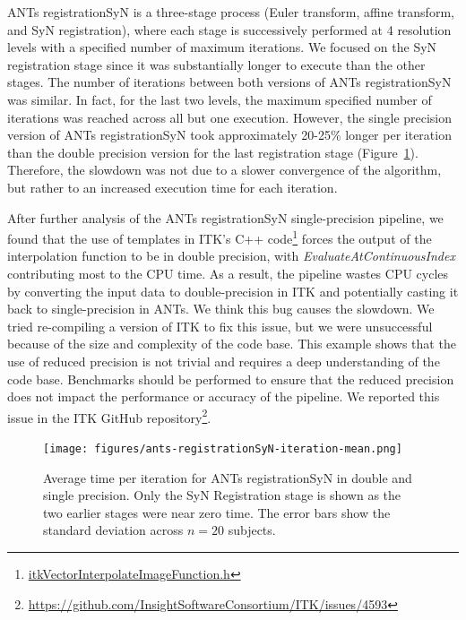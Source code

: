 \documentclass[conference]{IEEEtran}
\begin{document}
ANTs registrationSyN is a three-stage process (Euler transform, affine transform, and SyN registration), where each stage is successively performed at 4 resolution levels with a specified number of maximum iterations. We focused on the SyN registration stage since it was substantially longer to execute than the other stages. The number of iterations between both versions of ANTs registrationSyN was similar. In fact, for the last two levels, the maximum specified number of iterations was reached across all but one execution. However, the single precision version of ANTs registrationSyN took approximately 20-25\% longer per iteration than the double precision version for the last registration stage (Figure~\ref{fig:mean-time-per-iteration-ants}). Therefore, the slowdown was not due to a slower convergence of the algorithm, but rather to an increased execution time for each iteration.

After further analysis of the ANTs registrationSyN single-precision pipeline, we found that the use of templates in ITK's C++ code\footnote{\href{https://github.com/InsightSoftwareConsortium/ITK/blob/d9c585d96359bf304ad3047148cee81bf27ac0c1/Modules/Core/ImageFunction/include/itkVectorInterpolateImageFunction.h\#L46-L48}{itkVectorInterpolateImageFunction.h}} forces the output of the interpolation function to be in double precision, with \textit{EvaluateAtContinuousIndex} contributing most to the CPU time. As a result, the pipeline wastes CPU cycles by converting the input data to double-precision in ITK and potentially casting it back to single-precision in ANTs. We think this bug causes the slowdown. We tried re-compiling a version of ITK to fix this issue, but we were unsuccessful because of the size and complexity of the code base. This example shows that the use of reduced precision is not trivial and requires a deep understanding of the code base. Benchmarks should be performed to ensure that the reduced precision does not impact the performance or accuracy of the pipeline. We reported this issue in the ITK GitHub repository\footnote{\href{https://github.com/InsightSoftwareConsortium/ITK/issues/4593}{https://github.com/InsightSoftwareConsortium/ITK/issues/4593}}.

\begin{figure}
	\texttt{[image: figures/ants-registrationSyN-iteration-mean.png]}
	\caption{Average time per iteration for ANTs registrationSyN in double and single precision. Only the SyN Registration stage is shown as the two earlier stages were near zero time. The error bars show the standard deviation across $n=20$ subjects.}
	\label{fig:mean-time-per-iteration-ants}
\end{figure}
						
\end{document}
